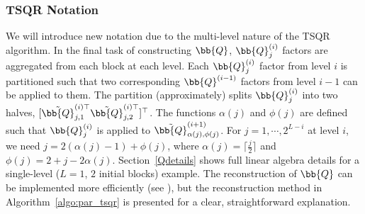		\subsubsection{TSQR Notation}
		We will introduce new notation due to the multi-level nature of the TSQR algorithm.
		In the final task of constructing $\bb{Q}$, $\bb{Q}_j^{(i)}$ factors are aggregated from each block at each level.
		Each $\bb{Q}_j^{(i)}$ factor from level $i$ is partitioned such that two corresponding $\bb{Q}^{(i-1)}$ factors from level $i-1$ can be applied to them. 
		The partition (approximately) splits $\bb{Q}_{j}^{(i)}$ into two halves, $[\tilde{\bb{Q}}_{j, 1}^{(i)\top} \tilde{\bb{Q}}_{j, 2}^{(i)\top}]^{\top}$.
		The functions $\alpha(j)$ and $\phi(j)$ are defined such that $\bb{Q}_j^{(i)}$ is applied to $\tilde{\bb{Q}}_{\alpha(j), \phi(j)}^{(i+1)}$.
		For $j = 1 , \cdots, 2^{L-i}$ at level $i$, we need $j = 2(\alpha(j)-1) + \phi(j)$, where $\alpha(j) = \lceil \frac{j}{2}\rceil$ and $\phi(j) = 2 + j - 2\alpha(j)$.
		Section~\ref{Qdetails} shows full linear algebra details for a single-level ($L=1$, $2$ initial blocks) example.
		The reconstruction of $\bb{Q}$ can be implemented more efficiently (see \cite{BDGJNS2014}), but the reconstruction method in Algorithm~\ref{algo:par_tsqr} is presented for a clear, straightforward explanation.
		

